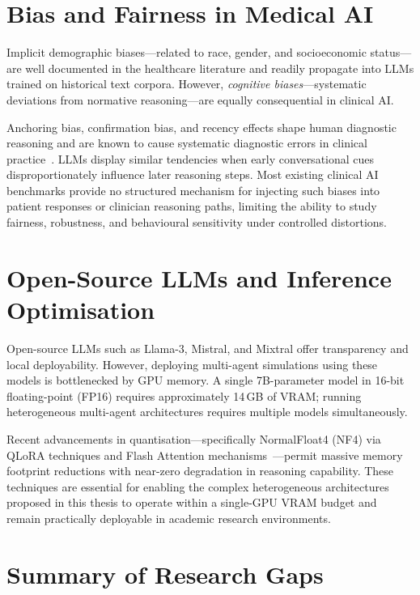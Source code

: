 \section{Bias and Fairness in Medical AI}

Implicit demographic biases---related to race, gender, and socioeconomic status---are well documented in the healthcare literature and readily propagate into LLMs trained on historical text corpora. However, \textit{cognitive biases}---systematic deviations from normative reasoning---are equally consequential in clinical AI.

Anchoring bias, confirmation bias, and recency effects shape human diagnostic reasoning and are known to cause systematic diagnostic errors in clinical practice~\cite{johri2023guidelines}. LLMs display similar tendencies when early conversational cues disproportionately influence later reasoning steps. Most existing clinical AI benchmarks provide no structured mechanism for injecting such biases into patient responses or clinician reasoning paths, limiting the ability to study fairness, robustness, and behavioural sensitivity under controlled distortions.

\section{Open-Source LLMs and Inference Optimisation}

Open-source LLMs such as Llama-3, Mistral, and Mixtral offer transparency and local deployability. However, deploying multi-agent simulations using these models is bottlenecked by GPU memory. A single 7B-parameter model in 16-bit floating-point (FP16) requires approximately 14\,GB of VRAM; running heterogeneous multi-agent architectures requires multiple models simultaneously.

Recent advancements in quantisation---specifically NormalFloat4 (NF4) via QLoRA techniques and Flash Attention mechanisms~\cite{du2023improving}---permit massive memory footprint reductions with near-zero degradation in reasoning capability. These techniques are essential for enabling the complex heterogeneous architectures proposed in this thesis to operate within a single-GPU VRAM budget and remain practically deployable in academic research environments.

\section{Summary of Research Gaps}

